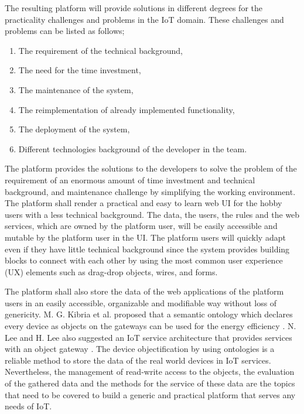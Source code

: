 The resulting platform will provide solutions in different degrees for the practicality challenges and problems in the IoT domain. These challenges and problems can be listed as follows;

\begin{enumerate}
    \item The requirement of the technical background,
    \item The need for the time investment,
    \item The maintenance of the system,
    \item The reimplementation of already implemented functionality,
    \item The deployment of the system,
    \item Different technologies background of the developer in the team.
\end{enumerate}


The platform provides the solutions to the developers to solve the problem of the requirement of an enormous amount of time investment and technical background, and maintenance challenge by simplifying the working environment. The platform shall render a practical and easy to learn web UI for the hobby users with a less technical background. The data, the users, the rules and the web services, which are owned by the platform user, will be easily accessible and mutable by the platform user in the UI. The platform users will quickly adapt even if they have little technical background since the system provides building blocks to connect with each other by using the most common user experience (UX) elements such as drag-drop objects, wires, and forms. 

The platform shall also store the data of the web applications of the platform users in an easily accessible, organizable and modifiable way without loss of genericity. M. G. Kibria et al. proposed that a semantic ontology which declares every device as objects on the gateways can be used for the energy efficiency \cite{7993747}. N. Lee and H. Lee also suggested an IoT service architecture that provides services with an object gateway \cite{6884496}. The device objectification by using ontologies is a reliable method to store the data of the real world devices in IoT services. Nevertheless, the management of read-write access to the objects, the evaluation of the gathered data and the methods for the service of these data are the topics that need to be covered to build a generic and practical platform that serves any needs of IoT.

